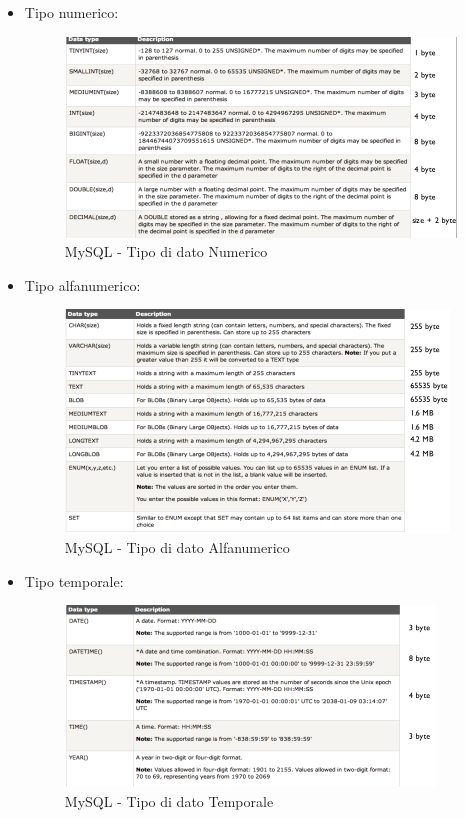 \begin{itemize}

\item Tipo numerico:

\begin{center}
\begin{figure}[H]
\centering
\includegraphics[scale=1]{figures/mySQL_numeric.png}
\caption{MySQL - Tipo di dato Numerico} 
\end{figure}
\end{center}

\item Tipo alfanumerico:

\begin{center}
\begin{figure}[H]
\centering
\includegraphics[scale=1]{figures/mySQL_alphanumeric.png}
\caption{MySQL - Tipo di dato Alfanumerico} 
\end{figure}
\end{center}

\item Tipo temporale:

\begin{center}
\begin{figure}[H]
\centering
\includegraphics[scale=1]{figures/mySQL_time.png}
\caption{MySQL - Tipo di dato Temporale} 
\end{figure}
\end{center}


\end{itemize}
